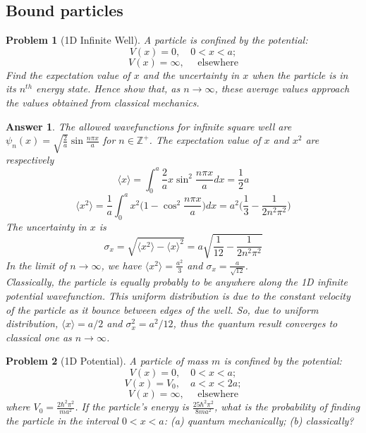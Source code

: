 \documentclass[a4paper]{article}
\newtheorem{ans}{Answer}[section]
\theoremstyle{new}
\newtheorem{qns}{Problem}[section]
\begin{document}
\subsection*{Bound particles}
\begin{qns}[1D Infinite Well]
A particle is confined by the potential:
$$V(x)=0,\quad 0<x<a;$$
$$V(x)=\infty,\quad\text{  elsewhere}$$
Find the expectation value of $x$ and the uncertainty in $x$ when the particle is in its $n^{th}$ energy state. Hence show that, as $n\rightarrow\infty$, these average values approach the values obtained from classical mechanics.
\end{qns}
\begin{ans}
The allowed wavefunctions for infinite square well are $\psi_n(x)=\sqrt{\frac{2}{a}}\sin\frac{n\pi x}{a}$ for $n\in\mathbb{Z}^+$. The expectation value of $x$ and $x^2$ are respectively
$$\langle x\rangle=\int_0^a\frac{2}{a}x\sin^2\frac{n\pi x}{a}dx=\frac{1}{2}a$$
$$\langle x^2\rangle=\frac{1}{a}\int_0^ax^2\bigg(1-\cos^2\frac{n\pi x}{a}\bigg)dx=a^2\bigg(\frac{1}{3}-\frac{1}{2n^2\pi^2}\bigg)$$
The uncertainty in $x$ is
$$\sigma_x=\sqrt{\langle x^2\rangle-\langle x\rangle^2}=a\sqrt{\frac{1}{12}-\frac{1}{2n^2\pi^2}}$$
In the limit of $n\rightarrow\infty$, we have $\langle x^2\rangle=\frac{a^2}{3}$ and $\sigma_x=\frac{a}{\sqrt{12}}$.\\[5pt]
Classically, the particle is equally probably to be anywhere along the 1D infinite potential wavefunction. This uniform distribution is due to the constant velocity of the particle as it bounce between edges of the well. So, due to uniform distribution, $\langle x\rangle=a/2$ and $\sigma_x^2=a^2/12$, thus the quantum result converges to classical one as $n\rightarrow\infty$. 
\end{ans}
\begin{qns}[1D Potential]
A particle of mass $m$ is confined by the potential:
$$V(x)=0,\quad 0<x<a;$$
$$V(x)=V_0,\quad a<x<2a;$$
$$V(x)=\infty,\quad\text{  elsewhere}$$
where $V_0=\frac{2\hbar^2\pi^2}{ma^2}$. If the particle's energy is $\frac{25\hbar^2\pi^2}{8ma^2}$, what is the probability of finding the particle in the interval $0 < x < a$: (a) quantum mechanically; (b) classically?
\end{qns}
\end{document}
